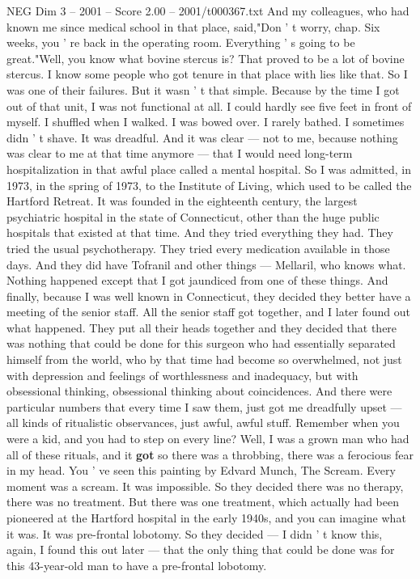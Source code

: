 \begin{textsample}{NEG Dim 3 – 2001 – Score 2.00 – 2001/t000367.txt}
And my colleagues, who had known me since medical school in that place, said,"Don ' t worry, chap.
Six weeks, you ' re back in the operating room.
Everything ' s going to be great."Well, you know what bovine stercus is?
That proved to be a lot of bovine stercus.
I know some people who got tenure in that place with lies like that.
So I was one of their failures.
But it wasn ' t that simple.
Because by the time I got out of that unit, I was not functional at all.
I could hardly see five feet in front of myself.
I shuffled when I walked.
I was bowed over.
I rarely bathed.
I sometimes didn ' t shave.
It was dreadful.
And it was clear — not to me, because nothing was clear to me at that time anymore — that I would need long-term hospitalization in that awful place called a mental hospital.
So I was admitted, in 1973, in the spring of 1973, to the Institute of Living, which used to be called the Hartford Retreat.
It was founded in the eighteenth century, the largest psychiatric hospital in the state of Connecticut, other than the huge public hospitals that existed at that time.
And they tried everything they had.
They tried the usual psychotherapy.
They tried every medication available in those days.
And they did have Tofranil and other things — Mellaril, who knows what.
Nothing happened except that I got jaundiced from one of these things.
And finally, because I was well known in Connecticut, they decided they better have a meeting of the senior staff.
All the senior staff got together, and I later found out what happened.
They put all their heads together and they decided that there was nothing that could be done for this surgeon who had essentially separated himself from the world, who by that time had become so overwhelmed, not just with depression and feelings of worthlessness and inadequacy, but with obsessional thinking, obsessional thinking about coincidences.
And there were particular numbers that every time I saw them, just got me dreadfully upset — all kinds of ritualistic observances, just awful, awful stuff.
Remember when you were a kid, and you had to step on every line?
Well, I was a grown man who had all of these rituals, and it \textbf{got} so there was a throbbing, there was a ferocious fear in my head.
You ' ve seen this painting by Edvard Munch, The Scream.
Every moment was a scream.
It was impossible.
So they decided there was no therapy, there was no treatment.
But there was one treatment, which actually had been pioneered at the Hartford hospital in the early 1940s, and you can imagine what it was.
It was pre-frontal lobotomy.
So they decided — I didn ' t know this, again, I found this out later — that the only thing that could be done was for this 43-year-old man to have a pre-frontal lobotomy.

\end{textsample}
